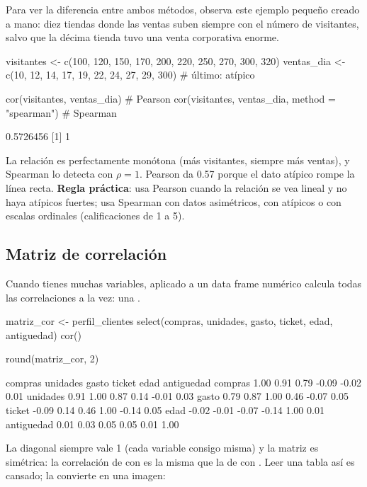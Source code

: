 Para ver la diferencia entre ambos métodos, observa este ejemplo pequeño
creado a mano: diez tiendas donde las ventas suben siempre con el número de
visitantes, salvo que la décima tienda tuvo una venta corporativa enorme.

\begin{rcode}
visitantes <- c(100, 120, 150, 170, 200, 220, 250, 270, 300, 320)
ventas_dia <- c(10, 12, 14, 17, 19, 22, 24, 27, 29, 300)  # último: atípico

cor(visitantes, ventas_dia)                        # Pearson
cor(visitantes, ventas_dia, method = "spearman")   # Spearman
\end{rcode}
\begin{rsalida}
[1] 0.5726456
[1] 1
\end{rsalida}

La relación es perfectamente monótona (más visitantes, siempre más ventas),
y Spearman lo detecta con $\rho = 1$. Pearson da 0.57 porque el dato
atípico rompe la línea recta. \textbf{Regla práctica}: usa Pearson cuando la
relación se vea lineal y no haya atípicos fuertes; usa Spearman con datos
asimétricos, con atípicos o con escalas ordinales (calificaciones de 1 a 5).

\subsection{Matriz de correlación}

Cuando tienes muchas variables,  aplicado a un data frame
numérico calcula todas las correlaciones a la vez: una
.

\begin{rcode}
matriz_cor <- perfil_clientes %
  select(compras, unidades, gasto, ticket, edad, antiguedad) %
  cor()

round(matriz_cor, 2)
\end{rcode}
\begin{rsalida}
           compras unidades gasto ticket  edad antiguedad
compras       1.00     0.91  0.79  -0.09 -0.02       0.01
unidades      0.91     1.00  0.87   0.14 -0.01       0.03
gasto         0.79     0.87  1.00   0.46 -0.07       0.05
ticket       -0.09     0.14  0.46   1.00 -0.14       0.05
edad         -0.02    -0.01 -0.07  -0.14  1.00       0.01
antiguedad    0.01     0.03  0.05   0.05  0.01       1.00
\end{rsalida}

La diagonal siempre vale 1 (cada variable consigo misma) y la matriz es
simétrica: la correlación de  con  es la misma
que la de  con . Leer una tabla así es
cansado;  la convierte en una imagen:

